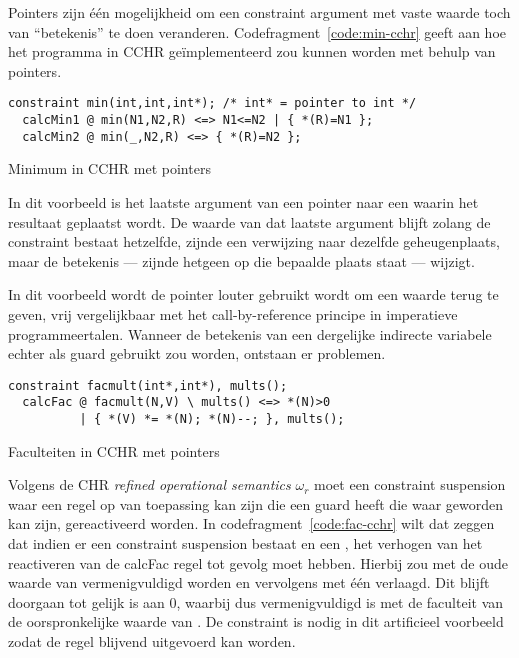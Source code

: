 Pointers zijn \'e\'en mogelijkheid om een constraint argument met vaste waarde toch van ``betekenis'' te doen veranderen. Codefragment~\ref{code:min-cchr} geeft aan hoe het  programma in CCHR ge\"implementeerd zou kunnen worden met behulp van pointers.
\begin{exCode}[h]
\begin{Verbatim}[frame=single]
  constraint min(int,int,int*); /* int* = pointer to int */
  calcMin1 @ min(N1,N2,R) <=> N1<=N2 | { *(R)=N1 };
  calcMin2 @ min(_,N2,R) <=> { *(R)=N2 };
\end{Verbatim}
\caption{Minimum in CCHR met pointers}
\label{code:min-cchr}
\end{exCode}

In dit voorbeeld is het laatste argument van  een pointer naar een  waarin het resultaat geplaatst wordt. De waarde van dat laatste argument blijft zolang de constraint bestaat hetzelfde, zijnde een verwijzing naar dezelfde geheugenplaats, maar de betekenis --- zijnde hetgeen op die bepaalde plaats staat --- wijzigt.

In dit voorbeeld wordt de pointer louter gebruikt wordt om een waarde terug te geven, vrij vergelijkbaar met het call-by-reference principe in imperatieve programmeertalen. Wanneer de betekenis van een dergelijke indirecte variabele echter als guard gebruikt zou worden, ontstaan er problemen.
\begin{exCode}[h]
\begin{Verbatim}[frame=single]
  constraint facmult(int*,int*), mults();
  calcFac @ facmult(N,V) \ mults() <=> *(N)>0 
          | { *(V) *= *(N); *(N)--; }, mults();
\end{Verbatim}
\caption{Faculteiten in CCHR met pointers}
\label{code:fac-cchr}
\end{exCode}

Volgens de CHR {\em refined operational semantics} $\omega_r$ moet een constraint suspension waar een regel op van toepassing kan zijn die een guard heeft die waar geworden kan zijn, gereactiveerd worden. In codefragment~\ref{code:fac-cchr} wilt dat zeggen dat indien er een  constraint suspension bestaat en een , het verhogen van  het reactiveren van de calcFac regel tot gevolg moet hebben. Hierbij zou  met de oude waarde van  vermenigvuldigd worden en  vervolgens met \'e\'en verlaagd. Dit blijft doorgaan tot  gelijk is aan $0$, waarbij  dus vermenigvuldigd is met de faculteit van de oorspronkelijke waarde van . De  constraint is nodig in dit artificieel voorbeeld zodat de  regel blijvend uitgevoerd kan worden.

